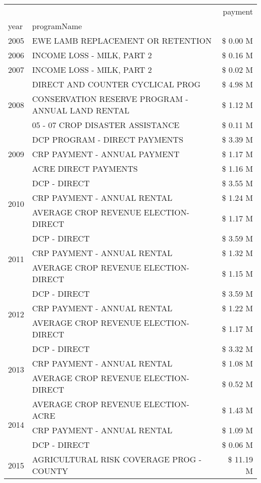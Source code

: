 \begin{tabular}{llr}
\toprule
 &  & payment \\
year & programName &  \\
\midrule
2005 & EWE LAMB REPLACEMENT OR RETENTION & \$ 0.00 M \\
\cline{1-3}
2006 & INCOME LOSS - MILK, PART 2 & \$ 0.16 M \\
\cline{1-3}
2007 & INCOME LOSS - MILK, PART 2 & \$ 0.02 M \\
\cline{1-3}
\multirow[t]{3}{*}{2008} & DIRECT AND COUNTER CYCLICAL PROG & \$ 4.98 M \\
 & CONSERVATION RESERVE PROGRAM - ANNUAL LAND RENTAL & \$ 1.12 M \\
 & 05 - 07 CROP DISASTER ASSISTANCE & \$ 0.11 M \\
\cline{1-3}
\multirow[t]{3}{*}{2009} & DCP PROGRAM - DIRECT PAYMENTS & \$ 3.39 M \\
 & CRP PAYMENT - ANNUAL PAYMENT & \$ 1.17 M \\
 & ACRE DIRECT PAYMENTS & \$ 1.16 M \\
\cline{1-3}
\multirow[t]{3}{*}{2010} & DCP - DIRECT & \$ 3.55 M \\
 & CRP PAYMENT - ANNUAL RENTAL & \$ 1.24 M \\
 & AVERAGE CROP REVENUE ELECTION-DIRECT & \$ 1.17 M \\
\cline{1-3}
\multirow[t]{3}{*}{2011} & DCP - DIRECT & \$ 3.59 M \\
 & CRP PAYMENT - ANNUAL RENTAL & \$ 1.32 M \\
 & AVERAGE CROP REVENUE ELECTION-DIRECT & \$ 1.15 M \\
\cline{1-3}
\multirow[t]{3}{*}{2012} & DCP - DIRECT & \$ 3.59 M \\
 & CRP PAYMENT - ANNUAL RENTAL & \$ 1.22 M \\
 & AVERAGE CROP REVENUE ELECTION-DIRECT & \$ 1.17 M \\
\cline{1-3}
\multirow[t]{3}{*}{2013} & DCP - DIRECT & \$ 3.32 M \\
 & CRP PAYMENT - ANNUAL RENTAL & \$ 1.08 M \\
 & AVERAGE CROP REVENUE ELECTION-DIRECT & \$ 0.52 M \\
\cline{1-3}
\multirow[t]{3}{*}{2014} & AVERAGE CROP REVENUE ELECTION-ACRE & \$ 1.43 M \\
 & CRP PAYMENT - ANNUAL RENTAL & \$ 1.09 M \\
 & DCP - DIRECT & \$ 0.06 M \\
\cline{1-3}
\multirow[t]{3}{*}{2015} & AGRICULTURAL RISK COVERAGE PROG - COUNTY & \$ 11.19 M \\

\end{tabular}
